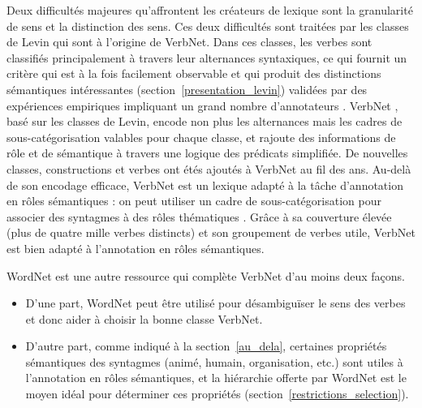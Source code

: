 
Deux difficultés majeures qu'affrontent les créateurs de lexique sont la
granularité de sens et la distinction des sens. Ces deux difficultés sont
traitées par les classes de Levin \citep{levin1993english} qui sont à l'origine
de VerbNet. Dans ces classes, les verbes sont classifiés principalement à
travers leur alternances syntaxiques, ce qui fournit un critère qui est à la
fois facilement observable et qui produit des distinctions sémantiques
intéressantes (section~\ref{presentation_levin}) validées par des expériences
empiriques impliquant un grand nombre d'annotateurs
\citep{hartshorne2014verbcorner}.  VerbNet \citep{kipperschuler2005verbnet},
basé sur les classes de Levin, encode non plus les alternances mais les cadres
de sous-catégorisation valables pour chaque classe, et rajoute des informations
de rôle et de sémantique à travers une logique des prédicats simplifiée. De
nouvelles classes, constructions et verbes ont étés ajoutés à VerbNet au fil
des ans. Au-delà de son encodage efficace, VerbNet est un lexique adapté à la
tâche d'annotation en rôles sémantiques : on peut utiliser un cadre de
sous-catégorisation pour associer des syntagmes à des rôles thématiques
\citep{swier2005exploiting,pradet2013revisiting}. Grâce à sa couverture élevée
(plus de quatre mille verbes distincts) et son groupement de verbes utile,
VerbNet est bien adapté à l'annotation en rôles sémantiques.


WordNet \citep{fellbaum1998wordnet} est une autre ressource qui complète
VerbNet d'au moins deux façons.

\begin{itemize}
    \item D'une part, WordNet peut être utilisé pour désambiguïser le sens des
        verbes et donc aider à choisir la bonne classe VerbNet.
    \item D'autre part, comme indiqué à la section~\ref{au_dela}, certaines
        propriétés sémantiques des syntagmes (animé, humain, organisation,
        etc.) sont utiles à l'annotation en rôles sémantiques, et la hiérarchie
        offerte par WordNet est le moyen idéal pour déterminer ces propriétés
        (section~\ref{restrictions_selection}).
\end{itemize}

